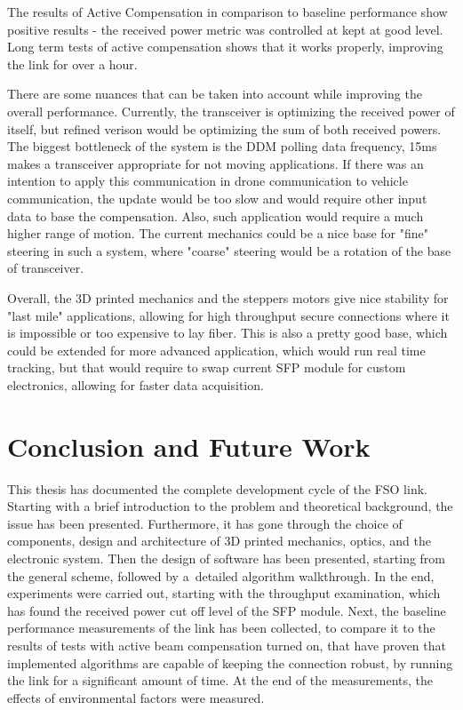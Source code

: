 \documentclass[master,oneside,en,oldtitlepage]{dyplompwr}
\begin{document}
The results of Active Compensation in comparison to baseline performance show positive results - the received power metric was controlled at kept at good level.
Long term tests of active compensation shows that it works properly, improving the link for over a hour.

There are some nuances that can be taken into account while improving the overall performance.
Currently, the transceiver is optimizing the received power of itself, but refined verison would be optimizing the sum of both received powers.
The biggest bottleneck of the system is the DDM polling data frequency, 15ms makes a transceiver appropriate for not moving applications.
If there was an intention to apply this communication in drone communication to vehicle communication, the update would be too slow and would require other input data to base the compensation. 
Also, such application would require a much higher range of motion. The current mechanics could be a nice base for "fine" steering in such a system, where "coarse" steering would be a rotation of the base of transceiver.

Overall, the 3D printed mechanics and the steppers motors give nice stability for "last mile" applications, allowing for high throughput secure connections where it is impossible or too expensive to lay fiber. 
This is also a pretty good base, which could be extended for more advanced application, which would run real time tracking, but that would require to swap current SFP module for custom electronics, allowing for faster data acquisition.


\chapter{Conclusion and Future Work}

This thesis has documented the complete development cycle of the FSO link. Starting with a brief introduction to the problem and theoretical background, the issue has been presented. Furthermore, it has gone through the choice of components, design and architecture of 3D printed mechanics, optics, and the electronic system. Then the design of software has been presented, starting from the general scheme, followed by a~detailed algorithm walkthrough. In the end, experiments were carried out, starting with the throughput examination, which has found the received power cut off level of the SFP module. Next, the baseline performance measurements of the link has been collected, to compare it to the results of tests with active beam compensation turned on, that have proven that implemented algorithms are capable of keeping the connection robust, by running the link for a significant amount of time. At the end of the measurements, the effects of environmental factors were measured.
\end{document}
